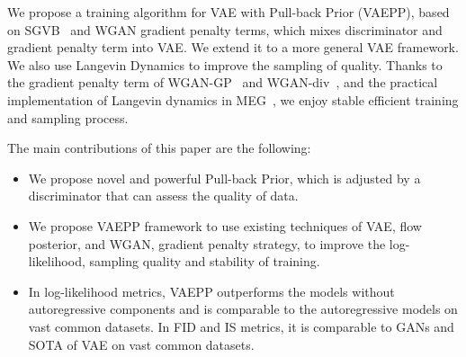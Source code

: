We propose a training algorithm for VAE with Pull-back Prior (VAEPP), based on SGVB~\cite{kingma2014auto} and WGAN gradient penalty terms, which mixes discriminator and gradient penalty term into VAE. We extend it to a more general VAE framework. We also use Langevin Dynamics to improve the sampling of quality. 
Thanks to the gradient penalty term of WGAN-GP~\cite{gulrajani2017improved} and WGAN-div~\cite{wu2018wasserstein}, and the practical implementation of Langevin dynamics in MEG~\cite{kumar2019maximum}, we enjoy stable efficient training and sampling process. 

The main contributions of this paper are the following:
\begin{itemize}
	\item We propose novel and powerful Pull-back Prior, which is adjusted by a discriminator that can assess the quality of data. 
	\item We propose VAEPP framework to use existing techniques of VAE, \EG flow posterior, and WGAN, \EG gradient penalty strategy, to improve the log-likelihood, sampling quality and stability of training. 
	\item In log-likelihood metrics, VAEPP outperforms the models without autoregressive components and is comparable to the autoregressive models on vast common datasets. In FID and IS metrics, it is comparable to GANs and SOTA of VAE on vast common datasets. 
\end{itemize}
